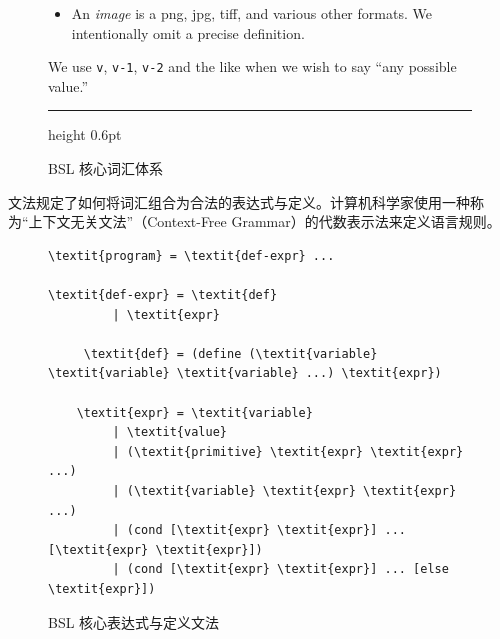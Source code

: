 \begin{figure}[htbp]
\begin{minipage}{\linewidth}
\begin{itemize}[leftmargin=1.4em, itemsep=1.5pt, parsep=0pt, topsep=2pt]
      \item An \textit{image} is a png, jpg, tiff, and various other formats. We intentionally omit a precise definition.
    \end{itemize}
    \vspace{2pt}
    We use \texttt{v}, \texttt{v-1}, \texttt{v-2} and the like when we wish to say ``any possible value.''
    \vspace{4pt}
    \hrule height 0.6pt
  \end{minipage}
  \caption{BSL 核心词汇体系}
  \label{fig:bsl_vocab}
\end{figure}

\label{sec:int01_grammar}

文法规定了如何将词汇组合为合法的表达式与定义。计算机科学家使用一种称为“上下文无关文法”（Context-Free Grammar）的代数表示法来定义语言规则。

\begin{figure}[htbp]
  \centering
\begin{stepperbox}[unbreakable]
\begin{Verbatim}[commandchars=\\\{\}, fontsize=\scriptsize]
 \textit{program} = \textit{def-expr} ...

\textit{def-expr} = \textit{def}
         | \textit{expr}

     \textit{def} = (define (\textit{variable} \textit{variable} \textit{variable} ...) \textit{expr})

    \textit{expr} = \textit{variable}
         | \textit{value}
         | (\textit{primitive} \textit{expr} \textit{expr} ...)
         | (\textit{variable} \textit{expr} \textit{expr} ...)
         | (cond [\textit{expr} \textit{expr}] ... [\textit{expr} \textit{expr}])
         | (cond [\textit{expr} \textit{expr}] ... [else \textit{expr}])
\end{Verbatim}
\end{stepperbox}
  \caption{BSL 核心表达式与定义文法}
  \label{fig:bsl_grammar}
\end{figure}

